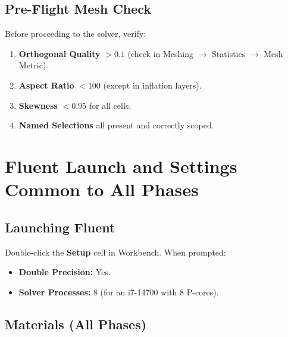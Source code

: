 \documentclass[12pt,a4paper]{report}
\begin{document}
\section{Pre-Flight Mesh Check}

Before proceeding to the solver, verify:

\begin{enumerate}
  \item \textbf{Orthogonal Quality} $> 0.1$ (check in Meshing
        $\rightarrow$ Statistics $\rightarrow$ Mesh Metric).
  \item \textbf{Aspect Ratio} $< 100$ (except in inflation layers).
  \item \textbf{Skewness} $< 0.95$ for all cells.
  \item \textbf{Named Selections} all present and correctly scoped.
\end{enumerate}

\noindent{}


\chapter{Fluent Launch and Settings Common to All Phases}
\label{ch:common}

\section{Launching Fluent}

Double-click the \textbf{Setup} cell in Workbench.  When prompted:
\begin{itemize}
  \item \textbf{Double Precision:} Yes.
  \item \textbf{Solver Processes:} 8 (for an i7-14700 with 8 P-cores).
\end{itemize}

\section{Materials (All Phases)}
\end{document}
